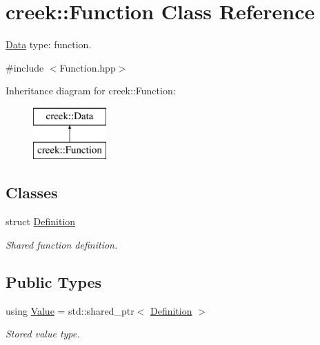 \hypertarget{classcreek_1_1_function}{}\section{creek\+:\+:Function Class Reference}
\label{classcreek_1_1_function}


\hyperlink{classcreek_1_1_data}{Data} type\+: function.  




{\ttfamily \#include $<$Function.\+hpp$>$}

Inheritance diagram for creek\+:\+:Function\+:\begin{figure}[H]
\begin{center}
\leavevmode
\includegraphics[height=2.000000cm]{classcreek_1_1_function}
\end{center}
\end{figure}
\subsection*{Classes}
\begin{DoxyCompactItemize}
\item 
struct \hyperlink{structcreek_1_1_function_1_1_definition}{Definition}
\begin{DoxyCompactList}\small\item\em Shared function definition. \end{DoxyCompactList}\end{DoxyCompactItemize}
\subsection*{Public Types}
\begin{DoxyCompactItemize}
\item 
using \hyperlink{classcreek_1_1_function_a544b21896f7382ae5a409fe5886aed6f}{Value} = std\+::shared\+\_\+ptr$<$ \hyperlink{structcreek_1_1_function_1_1_definition}{Definition} $>$\hypertarget{classcreek_1_1_function_a544b21896f7382ae5a409fe5886aed6f}{}\label{classcreek_1_1_function_a544b21896f7382ae5a409fe5886aed6f}

\begin{DoxyCompactList}\small\item\em Stored value type. \end{DoxyCompactList}\end{DoxyCompactItemize}
